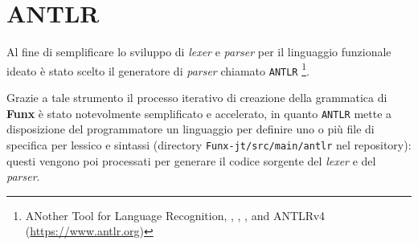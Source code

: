 \section{ANTLR}
\label{sec:5-1-antlr}

Al fine di semplificare lo sviluppo di \textit{lexer} e \textit{parser} per il linguaggio funzionale ideato
è stato scelto il generatore di \textit{parser} chiamato \texttt{ANTLR}%
\footnote{ANother Tool for Language Recognition,
    , \cite{Parr-1995-ANTLRGenerator},
    , \cite{Parr-2013-DefinitiveANTLR}
    and ANTLRv4 (\url{https://www.antlr.org})}.

\noindent Grazie a tale strumento il processo iterativo di creazione della grammatica di \textbf{Funx}
è stato notevolmente semplificato e accelerato, in quanto \texttt{ANTLR} mette a disposizione del programmatore
un linguaggio per definire uno o più file di specifica per lessico e sintassi
(directory \texttt{Funx-jt/src/main/antlr} nel repository): questi vengono poi processati
per generare il codice sorgente del \textit{lexer} e del \textit{parser}.

\newpage



